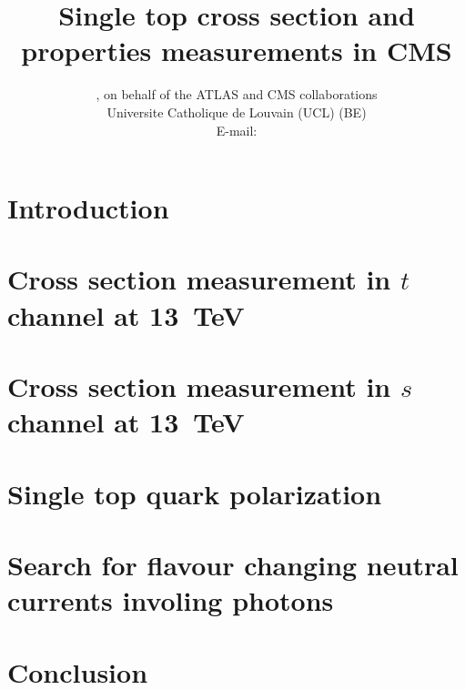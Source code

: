 \documentclass{PoS}
\title{Single top cross section and properties measurements in CMS}
\author{
    \speaker{Matthias Komm}, on behalf of the ATLAS and CMS collaborations\\
    Universite Catholique de Louvain (UCL) (BE)\\
    E-mail: \email{Matthias.Komm@cern.ch}
}
\begin{document}
\section{Introduction}
\section{Cross section measurement in $t$ channel at 13~TeV}
\section{Cross section measurement in $s$ channel at 13~TeV}
\section{Single top quark polarization}
\section{Search for flavour changing neutral currents involing photons}
\section{Conclusion}

\begin{thebibliography}{99}

\end{thebibliography}
\end{document}
